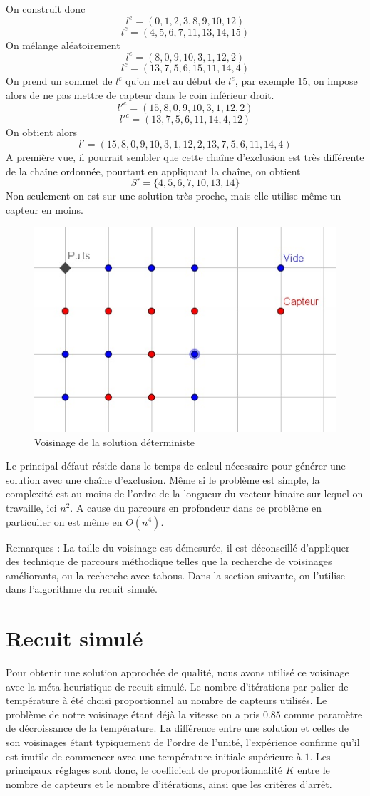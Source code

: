 \documentclass[12pt,a4paper]{article}
\begin{document}
On construit donc 
\[l^e=(0,1,2,3,8,9,10,12)\]
\[l^c=(4,5,6,7,11,13,14,15)\]
On mélange aléatoirement
\[l^e=(8,0,9,10,3,1,12,2)\]
\[l^c=(13,7,5,6,15,11,14,4)\]
On prend un sommet de $l^c$ qu'on met au début de $l^e$, par exemple $15$, on impose alors de ne pas mettre de capteur dans le coin inférieur droit.
\[l'^e=(15,8,0,9,10,3,1,12,2)\]
\[l'^c=(13,7,5,6,11,14,4,12)\]
On obtient alors 
\[l'=(15,8,0,9,10,3,1,12,2,13,7,5,6,11,14,4)\]
A première vue, il pourrait sembler que cette chaîne d'exclusion est très différente de la chaîne ordonnée, pourtant en appliquant la chaîne, on obtient
\[S'=\{4,5,6,7,10,13,14\}\]
Non seulement on est sur une solution très proche, mais elle utilise même un capteur en moins.
\begin{figure}[!h]
\center
\includegraphics[scale=1]{Images/4_1_1_neigh.jpg}
\caption{Voisinage de la solution déterministe}
\end{figure}

Le principal défaut réside dans le temps de calcul nécessaire pour générer une solution avec une chaîne d'exclusion. Même si le problème est simple, la complexité est au moins de l'ordre de la longueur du vecteur binaire sur lequel on travaille, ici $n^2$. A cause du parcours en profondeur dans ce problème en particulier on est même en $O(n^4)$.  

Remarques : La taille du voisinage est démesurée, il est déconseillé d'appliquer des technique de parcours méthodique telles que la recherche de voisinages améliorants, ou la recherche avec tabous. Dans la section suivante, on l'utilise dans l'algorithme du recuit simulé.
\section{Recuit simulé}
Pour obtenir une solution approchée de qualité, nous avons utilisé ce voisinage avec la méta-heuristique de recuit simulé. Le nombre d'itérations par palier de température à été choisi proportionnel au nombre de capteurs utilisés. Le problème de notre voisinage étant déjà la vitesse on a pris $0.85$ comme paramètre de décroissance de la température. La différence entre une solution et celles de son voisinages étant typiquement de l'ordre de l'unité, l'expérience confirme qu'il est inutile de commencer avec une température initiale supérieure à $1$. Les principaux réglages sont donc, le coefficient de proportionnalité $K$ entre le nombre de capteurs et le nombre d'itérations, ainsi que les critères d'arrêt.
\end{document}
